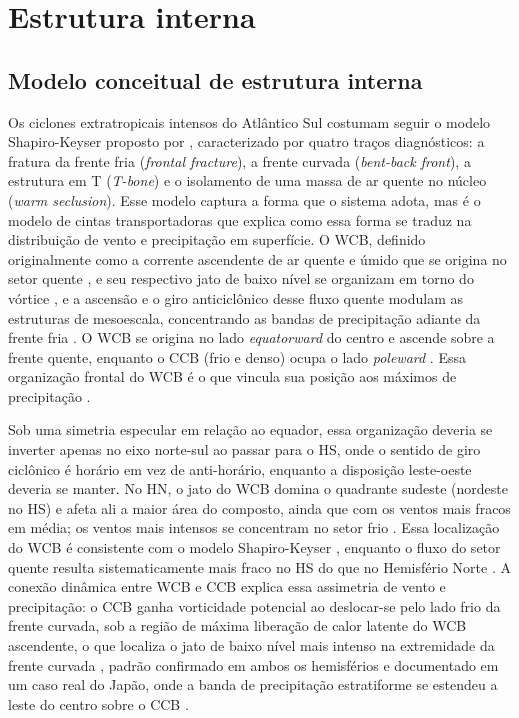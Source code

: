 \section{Estrutura interna}\label{sec:tb_evolucion}

\subsection{Modelo conceitual de estrutura interna}\label{subsec:tb_modelos}

Os ciclones extratropicais intensos do Atlântico Sul costumam seguir o modelo Shapiro-Keyser proposto por \citet{shapiro1990life}, caracterizado por quatro traços diagnósticos: a fratura da frente fria (\textit{frontal fracture}), a frente curvada (\textit{bent-back front}), a estrutura em T (\textit{T-bone}) e o isolamento de uma massa de ar quente no núcleo (\textit{warm seclusion}).
Esse modelo captura a forma que o sistema adota, mas é o modelo de cintas transportadoras que explica como essa forma se traduz na distribuição de vento e precipitação em superfície.
O WCB, definido originalmente como a corrente ascendente de ar quente e úmido que se origina no setor quente \citep{carlson1980airflow}, e seu respectivo jato de baixo nível se organizam em torno do vórtice \citep{browning1986conceptual}, e a ascensão e o giro anticiclônico desse fluxo quente modulam as estruturas de mesoescala, concentrando as bandas de precipitação adiante da frente fria \citep{coll2024lagrangian}.
O WCB se origina no lado \textit{equatorward} do centro e ascende sobre a frente quente, enquanto o CCB (frio e denso) ocupa o lado \textit{poleward} \citep{dacre2023climatology}.
Essa organização frontal do WCB é o que vincula sua posição aos máximos de precipitação \citep{catto2015fronts}.

Sob uma simetria especular em relação ao equador, essa organização deveria se inverter apenas no eixo norte-sul ao passar para o HS, onde o sentido de giro ciclônico é horário em vez de anti-horário, enquanto a disposição leste-oeste deveria se manter.
No HN, o jato do WCB domina o quadrante sudeste (nordeste no HS) e afeta ali a maior área do composto, ainda que com os ventos mais fracos em média; os ventos mais intensos se concentram no setor frio \citep{eisenstein2023identification}. Essa localização do WCB é consistente com o modelo Shapiro-Keyser \citep{catto2010climate}, enquanto o fluxo do setor quente resulta sistematicamente mais fraco no HS do que no Hemisfério Norte \citep{hodges2011comparison}.
A conexão dinâmica entre WCB e CCB explica essa assimetria de vento e precipitação: o CCB ganha vorticidade potencial ao deslocar-se pelo lado frio da frente curvada, sob a região de máxima liberação de calor latente do WCB ascendente, o que localiza o jato de baixo nível mais intenso na extremidade da frente curvada \citep{schemm2014linkage}, padrão confirmado em ambos os hemisférios \citep{priestley2022improved} e documentado em um caso real do Japão, onde a banda de precipitação estratiforme se estendeu a leste do centro sobre o CCB \citep{sawada2021heavy}.


